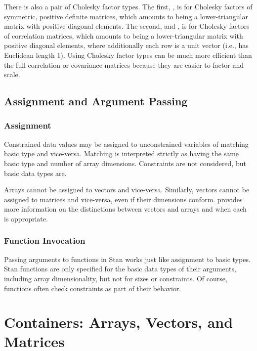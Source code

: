 There is also a pair of Cholesky factor types.  The first,
, is for Cholesky factors of symmetric,
positive definite matrices, which amounts to being a lower-triangular
matrix with positive diagonal elements.  The second, and
, is for Cholesky factors of correlation
matrices, which amounts to being a lower-triangular matrix with
positive diagonal elements, where additionally each row is a unit
vector (i.e., has Euclidean length 1).  Using Cholesky factor types
can be much more efficient than the full correlation or covariance
matrices because they are easier to factor and scale.



\section{Assignment and Argument Passing}

\subsection{Assignment}

Constrained data values may be assigned to unconstrained variables of
matching basic type and vice-versa.   Matching is interpreted strictly
as having the same basic type and number of array dimensions.
Constraints are not considered, but basic data types are.  

Arrays cannot be assigned to vectors and vice-versa.  Similarly,
vectors cannot be assigned to matrices and vice-versa, even if their
dimensions conform.   provides more information
on the distinctions between vectors and arrays and when each is
appropriate.

\subsection{Function Invocation}

Passing arguments to functions in Stan works just like assignment to
basic types.  Stan functions are only specified for the basic data
types of their arguments, including array dimensionality, but not for
sizes or constraints.  Of course, functions often check constraints as
part of their behavior.  



\chapter{Containers: Arrays, Vectors, and Matrices}\label{containers.chapter}

